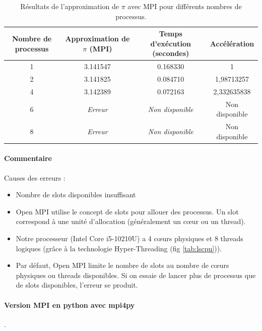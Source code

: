 \documentclass[a4paper,13pt]{book}
\begin{document}
    \begin{table}[h!]
        \centering
        \begin{tabular}{|c|c|c|c|}
        \hline
        \textbf{Nombre de processus} & \textbf{Approximation de $\pi$ (MPI)} & \textbf{Temps d'exécution (secondes)} & \textbf{Accélération} \\
        \hline
        1                           & 3.141547                              & 0.168330                  & 1 \\\hline
        2                           & 3.141825                              & 0.084710                 &    1,98713257          \\\hline
        4                           & 3.142389                              & 0.072163                   &     2,332635838       \\\hline
        6                           & \textit{Erreur}                       & \textit{Non disponible}      & Non disponible         \\\hline
        8                           & \textit{Erreur}                       & \textit{Non disponible}      & Non disponible         \\\hline
        \end{tabular}
        \caption{Résultats de l'approximation de $\pi$ avec MPI pour différents nombres de processus.}
        \label{tab:pi_mpi}
        \end{table}
    
    \paragraph{Commentaire }
    Causes des erreurs : 
    \begin{itemize}
    \item Nombre de slots disponibles insuffisant
    \item Open MPI utilise le concept de slots pour allouer des processus. Un slot correspond à une unité d'allocation (généralement un cœur ou un thread).
    \item Notre processeur (Intel Core i5-10210U) a 4 cœurs physiques et 8 threads logiques (grâce à la technologie Hyper-Threading (fig \ref{tab:lscpu})).
    \item Par défaut, Open MPI limite le nombre de slots au nombre de cœurs physiques ou threads disponibles. Si on essaie de lancer plus de processus que de slots disponibles, l'erreur se produit.
    \end{itemize}
\paragraph{Version MPI en python avec mpi4py}.\\
\end{document}
